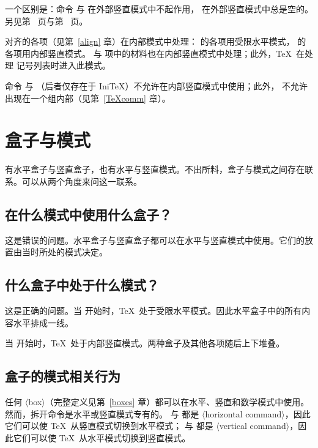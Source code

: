 \documentclass[a4paper]{rapport3}
\def\gr#1{$\langle$#1$\rangle$}\def\key#1{{\tt#1}}
\def\IniTeX{Ini\TeX}\def\LamsTeX{LAMS\TeX}\def\VirTeX{Vir\TeX}
\begin{document}
一个区别是：命令  与  在外部竖直模式中不起作用， 在外部竖直模式中总是空的。另见第~\pageref{lastbox} 页与第~\pageref{unskip} 页。

对齐的各项（见第~\ref{align} 章）在内部模式中处理： 的各项用受限水平模式， 的各项用内部竖直模式。 与  项中的材料也在内部竖直模式中处理；此外，\TeX\ 在处理  记号列表时进入此模式。

命令  与 （后者仅存在于 \IniTeX）不允许在内部竖直模式中使用；此外， 不允许出现在一个组内部（见第~\ref{TeXcomm} 章）。


\section{盒子与模式}
\label{hvbox}

有水平盒子与竖直盒子，也有水平与竖直模式。不出所料，盒子与模式之间存在联系。可以从两个角度来问这一联系。

\subsection{在什么模式中使用什么盒子？}

这是错误的问题。水平盒子与竖直盒子都可以在水平与竖直模式中使用。它们的放置由当时所处的模式决定。

\subsection{什么盒子中处于什么模式？}

这是正确的问题。当  开始时，\TeX\ 处于受限水平模式。因此水平盒子中的所有内容水平排成一线。

当  开始时，\TeX\ 处于内部竖直模式。两种盒子及其他各项随后上下堆叠。


\subsection{盒子的模式相关行为}

任何 \gr{box}（完整定义见第~\ref{boxes} 章）都可以在水平、竖直和数学模式中使用。然而，拆开命令是水平或竖直模式专有的。 与  都是 \gr{horizontal command}，因此它们可以使 \TeX\ 从竖直模式切换到水平模式；
\awp
{} 与  都是 \gr{vertical command}，因此它们可以使 \TeX\ 从水平模式切换到竖直模式。
\end{document}
